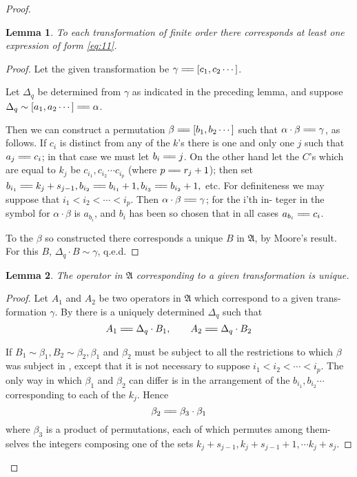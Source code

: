 \documentclass[10pt, twoside]{extarticle}
\newcommand{\td}[2][] {\todo[tickmarkheight=3pt, inline, size=\tiny, #1]{#2}}
\newcommand\longeq{=\joinrel=}
\theoremstyle{breaktheorem}
\theoremstyle{mylemma}
\newtheorem{lemma}{Lemma}
\theoremstyle{mydefinition}
\theoremstyle{mycorollary}
\begin{document}
\begin{proof}
\begin{lemma}
  \label{lemma:4}
  To each transformation of finite order there corresponds at
  least one expression of form \eqref{eq:11}.
\end{lemma}
\begin{proof}
  Let the given transformation be \(\gamma \longeq [c_1, c_2 \cdots]\).

  Let \(\Delta_q\) be determined from \(\gamma\) as indicated in the preceding lemma, and
  suppose \(\Delta_q \sim [a_1, a_2 \cdots] \longeq \alpha\).

  Then we can construct a permutation \(\beta \longeq [b_1, b_2 \cdots]\) such that
  \(\alpha \cdot \beta \longeq \gamma\), as follows. If \(c_i\) is distinct from any of the \(k\)'s there is one and
  only one \(j\) such that \(a_j \longeq c_i\); in that case we must let \(b_i \longeq j\). On the other
  hand let the \(C\)'s which are equal to \(k_j\) be \(c_{i_1}, c_{i_2} \cdots c_{i_p}\) (where \(p \longeq r_j + 1\));
  then set \(b_{i_1} \longeq k_j + s_{j-1}, b_{i_2} \longeq b_{i_1} +1, b_{i_3} \longeq b_{i_2} +1,\) etc. For definiteness
  we may suppose that \(i_1 < i_2 < \cdots < i_p\). Then \(\alpha \cdot \beta \longeq \gamma\); for the i'th in-
  teger in the symbol for \(\alpha \cdot \beta\) is \(a_{b_i}\), and \(b_i\) has been so chosen that in all
  cases \(a_{b_i} \longeq c_i\).

  To the \(\beta\) so constructed there corresponds a unique \(B\) in \(\mathfrak{A}\), by Moore's
  result. For this \(B\), \(\Delta_q \cdot B \sim \gamma\), q.e.d.\td{do I need hard code q.e.d?}
\end{proof}

\begin{lemma}
  \label{lemma:5}
  The operator in \(\mathfrak{A}\) corresponding to a given transformation
  is unique.
\end{lemma}
\td{proof newline}
\begin{proof}
  Let \(A_1\) and \(A_2\) be two operators in \(\mathfrak{A}\) which correspond to a given trans-
  formation \(\gamma\). By  there is a uniquely determined \(\Delta_q\)
  such that
  \[A_1 \longeq \Delta_q \cdot B_1, \qquad A_2 \longeq \Delta_q \cdot B_2\]

  If \(B_1 \sim \beta_1, B_2 \sim \beta_2, \beta_1\) and \(\beta_2\) must be subject to all the restrictions
  to which \(\beta\) was subject in , except that it is not necessary to suppose
  \(i_1 < i_2 < \cdots < i_p\). The only way in which \(\beta_1\) and \(\beta_2\) can differ is in the
  arrangement of the \(b_{i_1}, b_{i_2} \cdots\) corresponding to each of the \(k_j\). Hence
  \[\beta_2 \longeq \beta_3 \cdot \beta_1\]
  where \(\beta_3\) is a product of permutations, each of which permutes among them-
  selves the integers composing one of the sets \(k_j + s_{j-1}, k_j + s_{j-1} + 1, \cdots k_j + s_j\).


\end{proof}
\end{proof}
\end{document}
